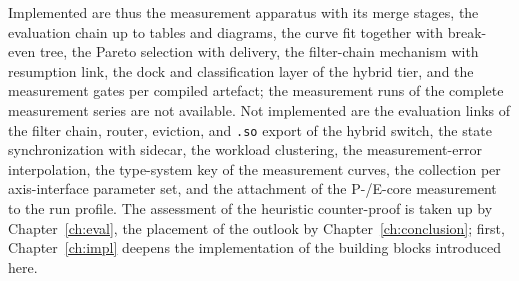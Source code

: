 \begin{nurkurz}
Implemented are thus the measurement apparatus with its merge stages, the evaluation chain up to tables
and diagrams, the curve fit together with break-even tree, the Pareto selection with delivery, the
filter-chain mechanism with resumption link, the dock and classification layer of the hybrid tier, and
the measurement gates per compiled artefact; the measurement runs of the complete measurement series
are not available. Not implemented are the evaluation links of the filter chain, router, eviction, and
\texttt{.so} export of the hybrid switch, the state synchronization with sidecar, the workload
clustering, the measurement-error interpolation, the type-system key of the measurement curves, the
collection per axis-interface parameter set, and the attachment of the P-/E-core measurement to the run
profile. The assessment of the heuristic counter-proof is taken up by Chapter~\ref{ch:eval}, the
placement of the outlook by Chapter~\ref{ch:conclusion}; first, Chapter~\ref{ch:impl} deepens the
implementation of the building blocks introduced here.
\end{nurkurz}
